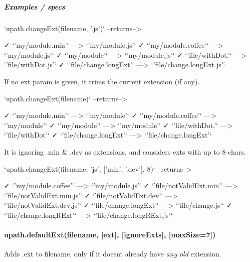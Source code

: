 \subparagraph*{Examples / specs}

\begin{DoxyVerb}`upath.changeExt(filename, '.js')`  --returns-->

    ✓ `'my/module.min'`            --->                `'my/module.js'`
    ✓ `'my/module.coffee'`         --->                `'my/module.js'`
    ✓ `'my/module'`                --->                `'my/module.js'`
    ✓ `'file/withDot.'`            --->             `'file/withDot.js'`
    ✓ `'file/change.longExt'`      --->      `'file/change.longExt.js'`
\end{DoxyVerb}


If no {\ttfamily ext} param is given, it trims the current extension (if any). \begin{DoxyVerb}`upath.changeExt(filename)`        --returns-->

      ✓ `'my/module.min'`            --->                   `'my/module'`
      ✓ `'my/module.coffee'`         --->                   `'my/module'`
      ✓ `'my/module'`                --->                   `'my/module'`
      ✓ `'file/withDot.'`            --->                `'file/withDot'`
      ✓ `'file/change.longExt'`      --->         `'file/change.longExt'`
\end{DoxyVerb}


It is ignoring {\ttfamily .min} \& {\ttfamily .dev} as extensions, and considers exts with up to 8 chars. \begin{DoxyVerb}`upath.changeExt(filename, 'js', ['min', '.dev'], 8)`        --returns-->

      ✓ `'my/module.coffee'`          --->                 `'my/module.js'`
      ✓ `'file/notValidExt.min'`      --->      `'file/notValidExt.min.js'`
      ✓ `'file/notValidExt.dev'`      --->      `'file/notValidExt.dev.js'`
      ✓ `'file/change.longExt'`       --->               `'file/change.js'`
      ✓ `'file/change.longRExt'`      --->      `'file/change.longRExt.js'`
\end{DoxyVerb}


\paragraph*{{\ttfamily upath.\+default\+Ext(filename, \mbox{[}ext\mbox{]}, \mbox{[}ignore\+Exts\mbox{]}, \mbox{[}max\+Size=7\mbox{]})}}

Adds {\ttfamily .ext} to {\ttfamily filename}, only if it doesn\textquotesingle{}t already have {\itshape any} {\itshape old} extension.


